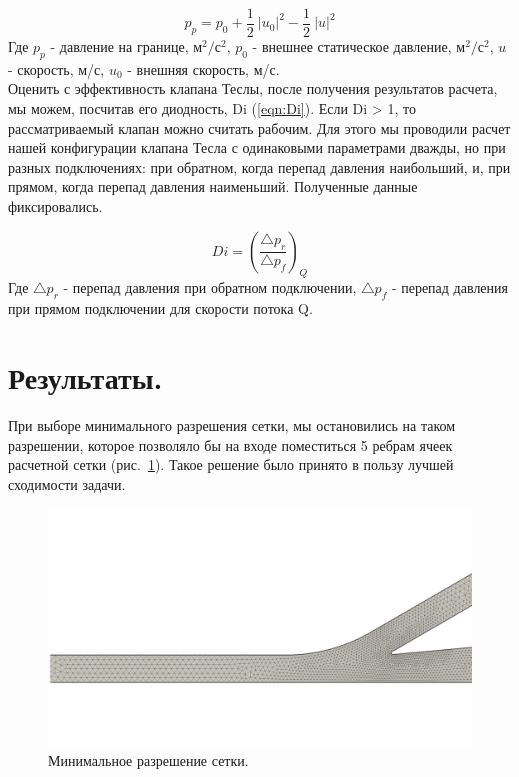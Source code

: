 \documentclass[14pt,a4paper]{article}
\begin{document}
        \begin{equation}\label{eqn:P0}
            p_{p} = p_{0} + \frac{1}{2}\ \left|u_{0}\right|^2 - \frac{1}{2}\ \left|u\right|^2
        \end{equation}
        Где $p_{p}$ - давление на границе, м$^{2}/$с$^{2}$, $p_{0}$ - внешнее статическое давление, м$^{2}/$с$^{2}$, $u$ - скорость, м/с, $u_{0}$ - внешняя скорость, м/с.\\
        
        Оценить с эффективность клапана Теслы, после получения результатов расчета, мы можем, посчитав его диодность, Di (\ref{eqn:Di}). Если Di > 1, то рассматриваемый клапан можно считать рабочим. Для этого мы проводили расчет нашей конфигурации клапана Тесла с одинаковыми параметрами дважды, но при разных подключениях: при обратном, когда перепад давления наибольший, и, при прямом, когда перепад давления наименьший. Полученные данные фиксировались.         
        
        \begin{equation}\label{eqn:Di}
            Di = (\frac{\bigtriangleup p_{r}}{\bigtriangleup p_{f}})_Q
        \end{equation}
        Где $\bigtriangleup p_{r}$ - перепад давления при обратном подключении, $\bigtriangleup p_{f}$ - перепад давления при прямом подключении для скорости потока Q.
        
        \section*{Результаты.}
        
        При выборе минимального разрешения сетки, мы остановились на таком разрешении, которое позволяло бы на входе поместиться 5 ребрам ячеек расчетной сетки (рис.~\ref{fig:minMesh}). Такое решение было принято в пользу лучшей сходимости задачи.
        
        \begin{figure}[H]
            \centering
            \includegraphics[width = 1\linewidth]{minMesh}
            \caption{Минимальное разрешение сетки.}
            \label{fig:minMesh}
        \end{figure}
        
\end{document}
